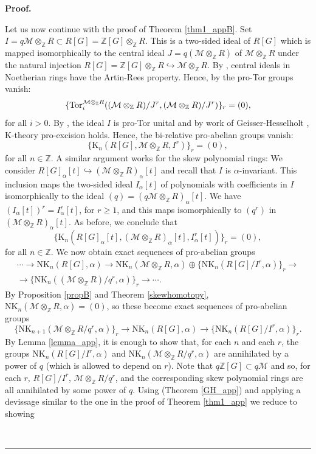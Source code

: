 \documentclass[reqno,11pt,letterpaper]{amsart}
\theoremstyle{plain}
\numberwithin{equation}{subsection}
\theoremstyle{remark}
\theoremstyle{plain}
\theoremstyle{definition}\newtheorem*{notation}{Notation}
\newcommand{\M}{{\mathcal M}}
\newenvironment{proof}[1][Proof]{\noindent\textbf{#1.} }{\ \rule{0.5em}{0.5em}}
\newcommand{\RK}{\mathrm{K}}
\newcommand{\RNK}{\mathrm{NK}}
\newcommand{\BZ}{\mathbb{Z}}
\begin{document}
\begin{proof}
 
  
Let us now continue with the proof of Theorem \ref{thm1_appB}. Set $I=q\M\otimes_\BZ R\subset R[G]=\BZ[G]\otimes_\BZ R$. This is a two-sided ideal of $R[G]$ which is mapped isomorphically to the central ideal $J=q(\M\otimes_\BZ R)$ of $\M\otimes_\BZ R$
  under the natural injection $R[G]=\BZ[G]\otimes_\BZ R\hookrightarrow \M\otimes_\BZ R$. By \cite[Theorem 13.3,  Exercise 1ZA(c)]{GoodWar},
 central ideals in Noetherian rings have the Artin-Rees property. Hence, by \cite[Lemma 2.1, Remark 2.2]{Morrowpro2} the pro-Tor groups vanish:
 \[
 \{{\rm Tor}^{\M\otimes_\BZ R}_i((\M\otimes_\BZ R)/J^r, (\M\otimes_\BZ R)/J^r)\}_r=(0),
 \]
for all $i>0$. By \cite[Theorem 0.2]{Morrowpro2}, the ideal $I$ is pro-Tor unital and by work of Geisser-Hesselholt \cite{GHbi}, $\RK$-theory pro-excision holds.
Hence, the bi-relative pro-abelian groups vanish:
\[
\{\RK_n(R[G], \M\otimes_\BZ R, I^r)\}_r=(0),
\]
 for all $n\in \BZ$. A similar argument works for the skew polynomial rings:
We consider $R[G]_\alpha[t]\hookrightarrow (\M\otimes_\BZ R)_\alpha[t]$ and recall that  $I$ is $\alpha$-invariant. This inclusion
maps the two-sided ideal $I_\alpha[t]$ of polynomials with coefficients in $I$ isomorphically to
the ideal $(q)=(q\M\otimes_\BZ R)_\alpha[t]$.  We have $(I_\alpha[t])^r=I^r_\alpha[t]$, for $r\geq 1$, and this maps isomorphically to $(q^r)$ in $(\M\otimes_\BZ R)_\alpha[t]$.
As before, we conclude  that 
\[
\{\RK_n(R[G]_\alpha[t], (\M\otimes_\BZ R)_\alpha[t], I^r_\alpha[t])\}_r=(0),
\]
for all $n\in \BZ$. We now obtain 
 exact sequences of pro-abelian groups
  \begin{multline}
  \cdots\to \RNK_n(R[G],\alpha)\to \RNK_n(\M\otimes_\BZ R,\alpha)\oplus \{\RNK_n(R[G]/I^r, \alpha)\}_r \to\\\to \{\RNK_n((\M\otimes_\BZ R)/q^{r},\alpha)\}_r\to\cdots. 
  \end{multline}
By Proposition \ref{propB} and Theorem \ref{skewhomotopy}, $\RNK_n(\M\otimes_\BZ R,\alpha)=(0)$, so these become exact sequences of pro-abelian groups
\[
  \{\RNK_{n+1}(\M\otimes_\BZ R/q^{r}, \alpha)\}_r   \to \RNK_n(R[G],\alpha)\to  \{\RNK_n(R[G]/I^r, \alpha)\}_r. 
\]
By Lemma \ref{lemma_app}, it is enough to show that, for each $n$ and each $r$, the groups
$\RNK_{n}(R[G]/I^r, \alpha)$ and $\RNK_{n }(\M\otimes_\BZ R/q^{r}, \alpha)$ are annihilated by a power of $q$  (which is allowed to depend on $r$).
Note that $q\BZ[G]\subset q\M$ and so, for each $r$, $R[G]/I^r$, $\M\otimes_\BZ R/q^{r}$, and the corresponding skew polynomial rings are
all annihilated by some power of $q$. Using \cite[Thm. A]{GH2} (Theorem \ref{GH_app}) and applying a devissage similar to the one in the proof of Theorem \ref{thm1_app} we reduce to showing 

\end{proof}
\end{document}
